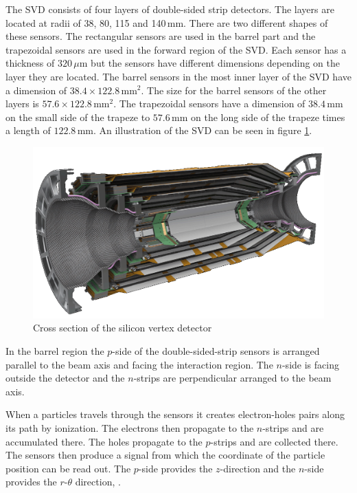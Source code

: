 \documentclass[a4paper,11pt,twosided,final,german,openbib,pdftex,listof=totoc,bibliography=totoc]{scrbook}
\begin{document}
The SVD consists of four layers of double-sided strip detectors. The layers are located at radii of 38, 80, 115 and 140$\,\textrm{mm}$. There are two different shapes of these sensors. The rectangular sensors are used in the barrel part and the trapezoidal sensors are used in the forward region of the SVD. Each sensor has a thickness of $320\,\mu\textrm{m}$ but the sensors have different dimensions depending on the layer they are located. The barrel sensors in the most inner layer of the SVD have a dimension of $38.4 \times 122.8\,\textrm{mm}^2$. The size for the barrel sensors of the other layers is $57.6 \times 122.8\,\textrm{mm}^2$. The trapezoidal sensors have a dimension of $38.4\,\textrm{mm}$ on the small side of the trapeze to $57.6\,\textrm{mm}$ on the long side of the trapeze times a length of $122.8\,\textrm{mm}$.\cite{B2TR} An illustration of the SVD can be seen in figure \ref{fig:SiliconVertex}. 

\begin{figure}[h!]
	\centering
	\includegraphics[width=\textwidth]{Bilder/SVD.png}
	\caption[Silicon Vertex Detector]{Cross section of the silicon vertex detector\cite{SVDItalian}}
	\label{fig:SiliconVertex}
\end{figure}

In the barrel region the $p$-side of the double-sided-strip sensors is arranged parallel to the beam axis and facing the interaction region. The $n$-side is facing outside the detector and the $n$-strips are perpendicular arranged to the beam axis. 

When a particles travels through the sensors it creates electron-holes pairs along its path by ionization. The electrons then propagate to the $n$-strips and are accumulated there. The holes propagate to the $p$-strips and are collected there. The sensors then produce a signal from which the coordinate of the particle position can be read out. The $p$-side provides the $z$-direction and the $n$-side provides the $r$-$\theta$ direction\cite{B2TR}, \cite{bergauer2010silicon}.
\end{document}
